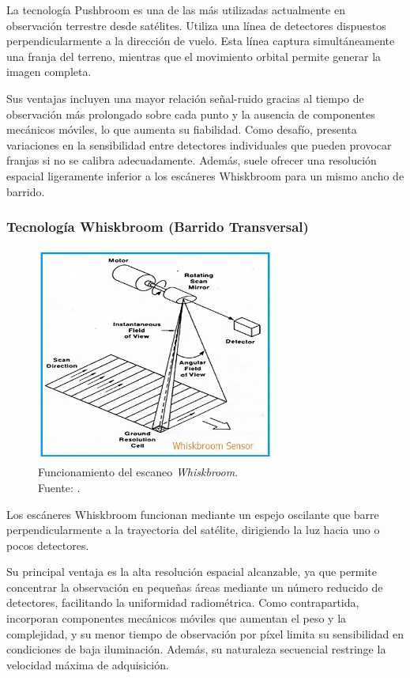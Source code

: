 La tecnología Pushbroom es una de las más utilizadas actualmente en observación terrestre desde satélites. Utiliza una línea de detectores dispuestos perpendicularmente a la dirección de vuelo. Esta línea captura simultáneamente una franja del terreno, mientras que el movimiento orbital permite generar la imagen completa.

Sus ventajas incluyen una mayor relación señal-ruido gracias al tiempo de observación más prolongado sobre cada punto y la ausencia de componentes mecánicos móviles, lo que aumenta su fiabilidad. Como desafío, presenta variaciones en la sensibilidad entre detectores individuales que pueden provocar franjas si no se calibra adecuadamente. Además, suele ofrecer una resolución espacial ligeramente inferior a los escáneres Whiskbroom para un mismo ancho de barrido.

\subsubsection{Tecnología Whiskbroom (Barrido Transversal)}

\begin{figure}[H]
    \centering
    \includegraphics[width=0.7\textwidth]{3.Conceptos_Previos/whiskbroom.jpg}
    \caption{Funcionamiento del escaneo \textit{Whiskbroom}.\\Fuente: \cite{whiskbroom_diagram}.}
    \label{fig:whiskbroom}
\end{figure}

Los escáneres Whiskbroom funcionan mediante un espejo oscilante que barre perpendicularmente a la trayectoria del satélite, dirigiendo la luz hacia uno o pocos detectores.

Su principal ventaja es la alta resolución espacial alcanzable, ya que permite concentrar la observación en pequeñas áreas mediante un número reducido de detectores, facilitando la uniformidad radiométrica. Como contrapartida, incorporan componentes mecánicos móviles que aumentan el peso y la complejidad, y su menor tiempo de observación por píxel limita su sensibilidad en condiciones de baja iluminación. Además, su naturaleza secuencial restringe la velocidad máxima de adquisición.

